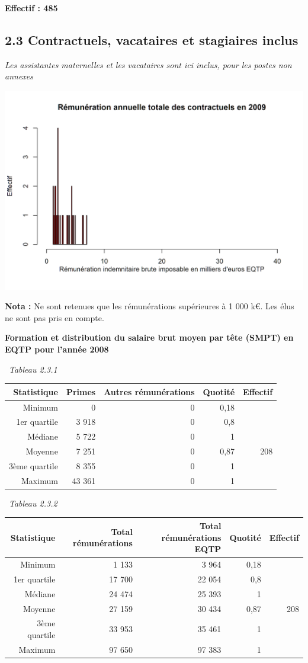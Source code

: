 \textbf{Effectif : 485 }

\hypertarget{contractuels-vacataires-et-stagiaires-inclus}{%
\subsection{2.3 Contractuels, vacataires et stagiaires
inclus}\label{contractuels-vacataires-et-stagiaires-inclus}}

\emph{Les assistantes maternelles et les vacataires sont ici inclus,
pour les postes non annexes}

\includegraphics{altair_files/figure-latex/unnamed-chunk-61-1.png}

\textbf{Nota :} Ne sont retenues que les rémunérations supérieures à 1
000 k€. Les élus ne sont pas pris en compte.

\textbf{Formation et distribution du salaire brut moyen par tête (SMPT)
en EQTP pour l'année 2008 }

~\emph{Tableau 2.3.1}

\begin{longtable}[]{@{}rrrrr@{}}
\toprule
Statistique & Primes & Autres rémunérations & Quotité &
Effectif\tabularnewline
\midrule
\endhead
Minimum & 0 & 0 & 0,18 &\tabularnewline
1er quartile & 3 918 & 0 & 0,8 &\tabularnewline
Médiane & 5 722 & 0 & 1 &\tabularnewline
Moyenne & 7 251 & 0 & 0,87 & 208\tabularnewline
3ème quartile & 8 355 & 0 & 1 &\tabularnewline
Maximum & 43 361 & 0 & 1 &\tabularnewline
\bottomrule
\end{longtable}

~\emph{Tableau 2.3.2}

\begin{longtable}[]{@{}rrrrr@{}}
\toprule
Statistique & Total rémunérations & Total rémunérations EQTP & Quotité &
Effectif\tabularnewline
\midrule
\endhead
Minimum & 1 133 & 3 964 & 0,18 &\tabularnewline
1er quartile & 17 700 & 22 054 & 0,8 &\tabularnewline
Médiane & 24 474 & 25 393 & 1 &\tabularnewline
Moyenne & 27 159 & 30 434 & 0,87 & 208\tabularnewline
3ème quartile & 33 953 & 35 461 & 1 &\tabularnewline
Maximum & 97 650 & 97 383 & 1 &\tabularnewline
\bottomrule
\end{longtable}

